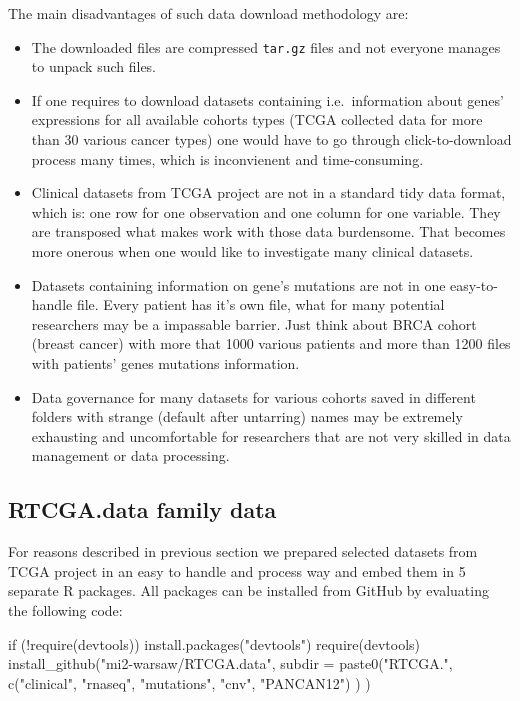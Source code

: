 The main disadvantages of such data download methodology are:

\begin{itemize}
\itemsep1pt\parskip0pt
\item
  The downloaded files are compressed \texttt{tar.gz} files and not
  everyone manages to unpack such files.
\item
  If one requires to download datasets containing i.e.~information about
  genes' expressions for all available cohorts types (TCGA collected
  data for more than 30 various cancer types) one would have to go
  through click-to-download process many times, which is inconvienent
  and time-consuming.
\item
  Clinical datasets from TCGA project are not in a standard tidy data
  format, which is: one row for one observation and one column for one
  variable. They are transposed what makes work with those data
  burdensome. That becomes more onerous when one would like to
  investigate many clinical datasets.
\item
  Datasets containing information on gene's mutations are not in one
  easy-to-handle file. Every patient has it's own file, what for many
  potential researchers may be a impassable barrier. Just think about
  BRCA cohort (breast cancer) with more that 1000 various patients and
  more than 1200 files with patients' genes mutations information.
\item
  Data governance for many datasets for various cohorts saved in
  different folders with strange (default after untarring) names may be
  extremely exhausting and uncomfortable for researchers that are not
  very skilled in data management or data processing.
\end{itemize}

\subsection{RTCGA.data family data}\label{rtcga.data-family-data}

For reasons described in previous section we prepared selected datasets
from TCGA project in an easy to handle and process way and embed them in
5 separate R packages. All packages can be installed from GitHub by
evaluating the following code:

\begin{Schunk}
\begin{Sinput}
if (!require(devtools)) {
    install.packages("devtools")
    require(devtools)
}
install_github("mi2-warsaw/RTCGA.data", 
                subdir = paste0("RTCGA.", 
                                c("clinical", "rnaseq", "mutations", "cnv", "PANCAN12")
                               )
 )
\end{Sinput}
\end{Schunk}

